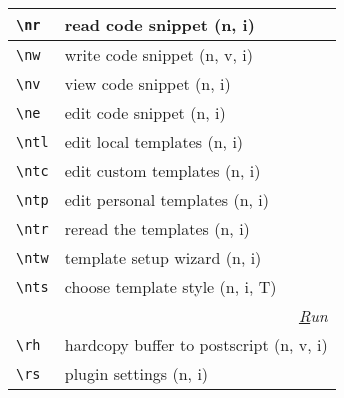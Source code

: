 \documentclass[oneside,10pt,landscape,DIV16]{scrartcl}
\begin{document}
\begin{multicols}{3}
\begin{center}
\begin{tabular}[]{|p{11mm}|p{58mm}|}
\hline \verb'\nr'  & read code snippet         \hfill (n, i)   \\
\hline \verb'\nw'  & write code snippet        \hfill (n, v, i)\\
\hline \verb'\nv'  & view code snippet         \hfill (n, i)   \\
\hline \verb'\ne'  & edit code snippet         \hfill (n, i)   \\
%
\hline \verb'\ntl' & edit local templates      \hfill (n, i)\\
\hline \verb'\ntc' & edit custom templates     \hfill (n, i)\\
\hline \verb'\ntp' & edit personal templates   \hfill (n, i)\\
\hline \verb'\ntr' & reread the templates      \hfill (n, i)\\
\hline \verb'\ntw' & template setup wizard     \hfill (n, i)\\
\hline \verb'\nts' & choose template style     \hfill (n, i, T)\\
%
\hline
\hline
\multicolumn{2}{|r|}{\textsl{\underline{R}un}} \\[1.0ex]
\hline \verb'\rh'    & hardcopy buffer to postscript \hfill (n, v, i)\\
\hline \verb'\rs'    & plugin settings \hfill (n, i)\\
\hline
\end{tabular}\\
%
%
\end{center}%
\end{multicols}%
%
\end{document}

